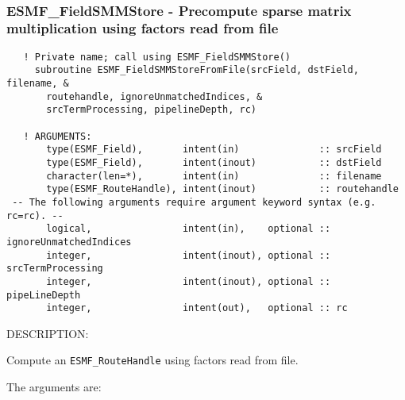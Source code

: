  
\mbox{}\hrulefill\ 
 
\subsubsection [ESMF\_FieldSMMStore] {ESMF\_FieldSMMStore - Precompute sparse matrix multiplication using factors read from file}


  
\begin{verbatim}   ! Private name; call using ESMF_FieldSMMStore()
     subroutine ESMF_FieldSMMStoreFromFile(srcField, dstField, filename, &
       routehandle, ignoreUnmatchedIndices, &
       srcTermProcessing, pipelineDepth, rc)
 
   ! ARGUMENTS:
       type(ESMF_Field),       intent(in)              :: srcField  
       type(ESMF_Field),       intent(inout)           :: dstField
       character(len=*),       intent(in)              :: filename
       type(ESMF_RouteHandle), intent(inout)           :: routehandle
 -- The following arguments require argument keyword syntax (e.g. rc=rc). --
       logical,                intent(in),    optional :: ignoreUnmatchedIndices
       integer,                intent(inout), optional :: srcTermProcessing
       integer,                intent(inout), optional :: pipeLineDepth
       integer,                intent(out),   optional :: rc\end{verbatim}
{\sf DESCRIPTION:\\ }


  
   Compute an {\tt ESMF\_RouteHandle} using factors read from file.
  
   The arguments are:
  
